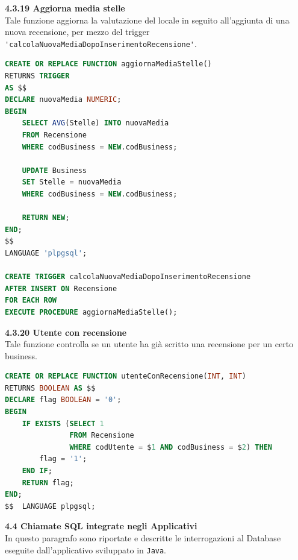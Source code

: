 \documentclass[a4paper,12pt]{article}
\begin{document}
\newpage\null{}\setcounter{page}{24}
\vspace{-2cm}
{\flushleft \bf 4.3.19  Aggiorna media stelle}\\
Tale funzione aggiorna la valutazione del locale in seguito all'aggiunta di una
nuova recensione, per mezzo del trigger \verb|'calcolaNuovaMediaDopoInserimentoRecensione'|.
\begin{lstlisting}[language=SQL]
CREATE OR REPLACE FUNCTION aggiornaMediaStelle()
RETURNS TRIGGER
AS $$
DECLARE nuovaMedia NUMERIC;
BEGIN
    SELECT AVG(Stelle) INTO nuovaMedia
    FROM Recensione
    WHERE codBusiness = NEW.codBusiness;

    UPDATE Business
    SET Stelle = nuovaMedia
    WHERE codBusiness = NEW.codBusiness;

    RETURN NEW;
END;
$$
LANGUAGE 'plpgsql';

CREATE TRIGGER calcolaNuovaMediaDopoInserimentoRecensione
AFTER INSERT ON Recensione
FOR EACH ROW
EXECUTE PROCEDURE aggiornaMediaStelle();
\end{lstlisting}

\vspace*{+1cm}

{\flushleft \bf 4.3.20  Utente con recensione}\\
Tale funzione controlla se un utente ha già scritto una recensione per un certo
business.
\begin{lstlisting}[language=SQL]
CREATE OR REPLACE FUNCTION utenteConRecensione(INT, INT)
RETURNS BOOLEAN AS $$
DECLARE flag BOOLEAN = '0';
BEGIN
	IF EXISTS (SELECT 1 
			   FROM Recensione 
			   WHERE codUtente = $1 AND codBusiness = $2) THEN
		flag = '1';
	END IF;
	RETURN flag;
END;
$$  LANGUAGE plpgsql;
\end{lstlisting}

\newpage\null{}\setcounter{page}{24}
\vspace{-2cm}
{\flushleft \bf 4.4  Chiamate SQL integrate negli Applicativi}\\
In questo paragrafo sono riportate e descritte le interrogazioni al Database eseguite dall'applicativo sviluppato in \verb|Java|.
\end{document}
